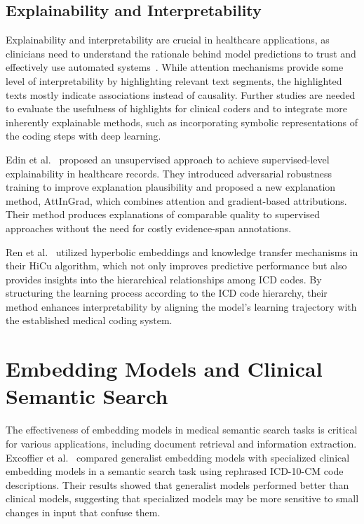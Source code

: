 \documentclass[12pt,a4paper]{report}
\begin{document}
\subsection{Explainability and Interpretability}

Explainability and interpretability are crucial in healthcare applications, as clinicians need to understand the rationale behind model predictions to trust and effectively use automated systems~\cite{holzinger2017we}. While attention mechanisms provide some level of interpretability by highlighting relevant text segments, the highlighted texts mostly indicate associations instead of causality. Further studies are needed to evaluate the usefulness of highlights for clinical coders and to integrate more inherently explainable methods, such as incorporating symbolic representations of the coding steps with deep learning.

Edin et al.~\cite{edin2024unsupervised} proposed an unsupervised approach to achieve supervised-level explainability in healthcare records. They introduced adversarial robustness training to improve explanation plausibility and proposed a new explanation method, AttInGrad, which combines attention and gradient-based attributions. Their method produces explanations of comparable quality to supervised approaches without the need for costly evidence-span annotations.

Ren et al.~\cite{ren2022hicu} utilized hyperbolic embeddings and knowledge transfer mechanisms in their HiCu algorithm, which not only improves predictive performance but also provides insights into the hierarchical relationships among ICD codes. By structuring the learning process according to the ICD code hierarchy, their method enhances interpretability by aligning the model's learning trajectory with the established medical coding system.

\section{Embedding Models and Clinical Semantic Search}

The effectiveness of embedding models in medical semantic search tasks is critical for various applications, including document retrieval and information extraction. Excoffier et al.~\cite{excoffier2024generalist} compared generalist embedding models with specialized clinical embedding models in a semantic search task using rephrased ICD-10-CM code descriptions. Their results showed that generalist models performed better than clinical models, suggesting that specialized models may be more sensitive to small changes in input that confuse them.
\end{document}
